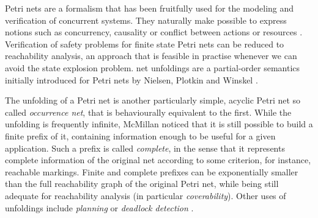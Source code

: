 \documentclass[11pt,a4paper]{article}
\begin{document}

Petri nets are a formalism that has been fruitfully used for the modeling and
verification of concurrent systems.  They naturally make possible to express
notions such as concurrency, causality or conflict between actions or resources
.  Verification of safety problems for finite state Petri nets can
be reduced to reachability analysis, an approach that is feasible in practise
whenever we can avoid the state explosion problem.  net unfoldings are a
partial-order semantics initially introduced for Petri nets by Nielsen, Plotkin
and Winskel .

The unfolding of a Petri net is another particularly simple, acyclic Petri net
so called \emph{occurrence net}, that is behaviourally equivalent to the first.
While the unfolding is frequently infinite, McMillan noticed  that
it is still possible to build a finite prefix of it, containing information
enough to be useful for a given application.  Such a prefix is called
\emph{complete}, in the sense that it represents complete information of
the original net according to some criterion, for instance, reachable markings.
Finite and complete prefixes can be exponentially smaller than the full
reachability graph of the original Petri net, while being still adequate for
reachability analysis (in particular \emph{coverability}).  Other uses of
unfoldings include \emph{planning}  or \emph{deadlock detection}
.
\end{document}
